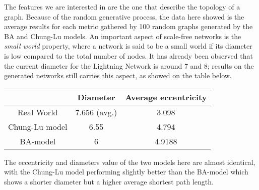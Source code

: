 	The features we are interested in are the one that describe the topology of a graph. Because of the random generative process, the data here showed is the average results for each metric gathered by 100 random graphs generated by the BA and Chung-Lu models. An important aspect of scale-free networks is the \textit{small world} property, where a network is said to be a small world if its diameter is low compared to the total number of nodes. It has already been observed that the current diameter for the Lightning Network is around 7 and 8; results on the generated networks still carries this aspect, as showed on the table below.
	
	\begin{center}
		\begin{tabulary}{0.9\linewidth}{| C | C | C |}
			\hline
			& Diameter & Average eccentricity \\ \hline
			Real World & 7.656 (avg.) & 3.098 \\ \hline
			Chung-Lu model & 6.55 &  4.794 \\ \hline
			BA-model & 6 & 4.9188 \\ 
			\hline
		\end{tabulary}
	\end{center}
	The eccentricity and diameters value of the two models here are almost identical, with the Chung-Lu model performing slightly better than the BA-model which shows a shorter diameter but a higher average shortest path length.
	
